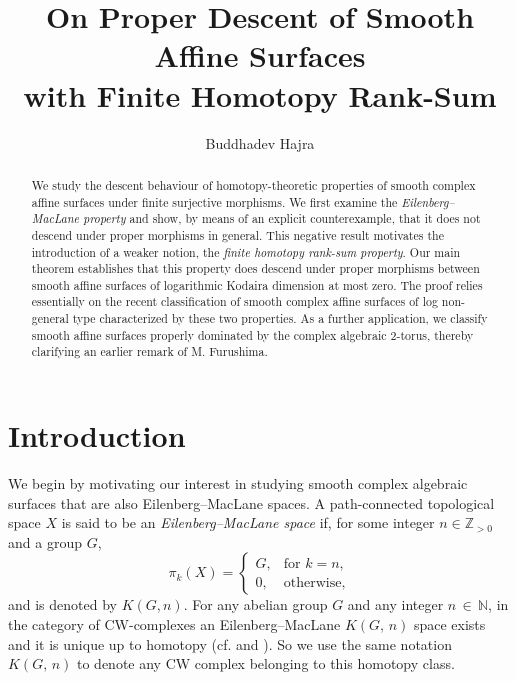 \documentclass[12pt,reqno,twoside]{amsart}
\theoremstyle{definition}
\numberwithin{equation}{section}
\newcommand{\N}{\mathbb{N}}
\newcommand{\Z}{\mathbb{Z}}
\begin{document}
\title[On Proper Descent of Smooth Affine Surfaces with Finite Homotopy Rank-Sum]{On Proper Descent of Smooth Affine Surfaces\\with Finite Homotopy Rank-Sum}
\author[B. Hajra]{Buddhadev Hajra}

\address{Stat-Math-Unit, Indian Statistical Institute Kolkata, 203 B. T. Road, Baranagar, Kolkata 700108, India}




\begin{abstract}
We study the descent behaviour of homotopy-theoretic properties of smooth complex affine surfaces under finite surjective morphisms. We first examine the {\it Eilenberg--MacLane property} and show, by means of an explicit counterexample, that it does not descend under proper morphisms in general. This negative result motivates the introduction of a weaker notion, the {\it finite homotopy rank-sum property}. Our main theorem establishes that this property does descend under proper morphisms between smooth affine surfaces of logarithmic Kodaira dimension at most zero. The proof relies essentially on the recent classification of smooth complex affine surfaces of log non-general type characterized by these two properties. As a further application, we classify smooth affine surfaces properly dominated by the complex algebraic 2-torus, thereby clarifying an earlier remark of M. Furushima.
\end{abstract}

\maketitle

\tableofcontents

\section{\bf Introduction}\label{se1}



We begin by motivating our interest in studying smooth complex algebraic surfaces that are also Eilenberg--MacLane spaces. A path-connected topological space $X$ is said to be an \emph{Eilenberg--MacLane space} if, for some integer $n \in \Z_{>0}$ and a group $G$,
\[
\pi_k(X)=
\begin{cases}
G, & \text{for } k=n,\\[2mm]
0, & \text{otherwise},
\end{cases}
\]
and is denoted by $K(G,n)$. For any abelian group $G$ and any integer $n\,\in\, \N$, in the category of CW-complexes an Eilenberg--MacLane $K(G,\,n)$ space exists
and it is unique up to homotopy (cf. \cite[Chapter 8, \S1, Corollary 5]{Spa1966} and \cite[Corollary 2]{MT1968}). So we use the same notation $K(G,\,n)$ to denote any CW complex belonging to this homotopy class.
\end{document}
